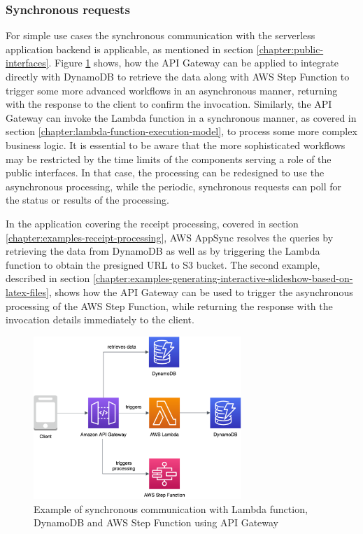 \subsubsection{Synchronous requests} \label{chapter:client-synchronous-requests}

For simple use cases the synchronous communication with the serverless application backend is applicable, as mentioned in section \ref{chapter:public-interfaces}.
Figure \ref{fig:pattern-synchronous-request} shows, how the API Gateway can be applied to integrate directly with DynamoDB to retrieve the data along with AWS Step Function to trigger some more advanced workflows in an asynchronous manner, returning with the response to the client to confirm the invocation.
Similarly, the API Gateway can invoke the Lambda function in a synchronous manner, as covered in section \ref{chapter:lambda-function-execution-model}, to process some more complex business logic.
It is essential to be aware that the more sophisticated workflows may be restricted by the time limits of the components serving a role of the public interfaces.
In that case, the processing can be redesigned to use the asynchronous processing, while the periodic, synchronous requests can poll for the status or results of the processing.

In the application covering the receipt processing, covered in section \ref{chapter:examples-receipt-processing}, AWS AppSync resolves the queries by retrieving the data from DynamoDB as well as by triggering the Lambda function to obtain the presigned URL to S3 bucket.
The second example, described in section \ref{chapter:examples-generating-interactive-slideshow-based-on-latex-files}, shows how the API Gateway can be used to trigger the asynchronous processing of the AWS Step Function, while returning the response with the invocation details immediately to the client.

\begin{figure}[H]
   \centering
   \includegraphics[width=0.7\textwidth]{assets/04-serverless-for-web-apps/synchronousRequest.png}
   \caption{Example of synchronous communication with Lambda function, DynamoDB and AWS Step Function using API Gateway}
   \label{fig:pattern-synchronous-request}
\end{figure}

